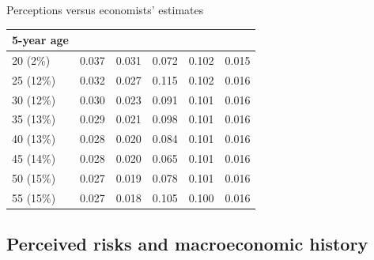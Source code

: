 \documentclass{beamer}
\begin{document}
\begin{frame}{Perceptions versus economists' estimates}
\begin{table}
{\begin{tabular}{llllll}
				5-year age           &               &                       &                         &               &              \\
					\hline 
				20 (2\%)             & 0.037         & 0.031                 & 0.072                   & 0.102         & 0.015        \\
				25 (12\%)            & 0.032         & 0.027                 & 0.115                   & 0.102         & 0.016        \\
				30 (12\%)            & 0.030         & 0.023                 & 0.091                   & 0.101         & 0.016        \\
				35 (13\%)            & 0.029         & 0.021                 & 0.098                   & 0.101         & 0.016        \\
				40 (13\%)            & 0.028         & 0.020                 & 0.084                   & 0.101         & 0.016        \\
				45 (14\%)            & 0.028         & 0.020                 & 0.065                   & 0.101         & 0.016        \\
				50 (15\%)            & 0.027         & 0.019                 & 0.078                   & 0.101         & 0.016        \\
				55 (15\%)            & 0.027         & 0.018                 & 0.105                   & 0.100         & 0.016        \\
				\hline 
			\end{tabular}
		}
	\end{table}
\end{frame}


\subsection{Perceived risks and macroeconomic history}


\end{document}
